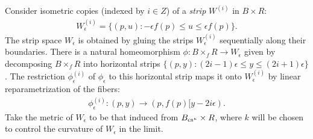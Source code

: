 Consider  isometric copies (indexed by $i\in Z$) of a \emph{strip} $W^{(i)}$ in $ B \times R$:
\begin{eqnarray}
W_{\epsilon}^{(i)} = \{(p, u) :   -\epsilon f(p) \le u\le  \epsilon f(p)\}.                                                                                                                                                                                                                                                \end{eqnarray}
The strip space $W_\epsilon$ is obtained by gluing the strips  $W_{\epsilon}^{(i)}$ 
sequentially  along 
their boundaries. There is a natural homeomorphism $\phi : B \times_ f R \to W_\epsilon$ 
given by decomposing $B \times_ f R$ into horizontal strips 
  $\{(p, y) :   (2i-1)\epsilon\le y\le (2i+1) \epsilon \}$. 
The restriction $\phi_\epsilon^{(i)}$ of $\phi_\epsilon$ to this horizontal strip maps it onto $W_{\epsilon}^{(i)}$
by linear reparametrization of the fibers:
\begin{eqnarray}
\phi_\epsilon^{(i)}: (p,y) \to ( p,f(p)[y-2i\epsilon) .                                                                                                                                                                                                                                                                                                         
\end{eqnarray}
Take the metric of $W_\epsilon$ to be that induced from $B_{\cs\kappa}\times R$,
where $k$ will be chosen to control the curvature of $W_\epsilon$ in the limit.



